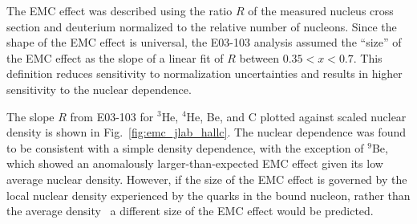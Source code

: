 The EMC effect was described using the ratio $R$ of the measured nucleus cross section and deuterium
normalized to the relative number of nucleons.
Since the shape of the EMC effect is universal, the E03-103 analysis assumed the ``size'' of the EMC
effect as the slope of a linear fit of $R$ between $0.35<x<0.7$.  This definition reduces sensitivity to
normalization uncertainties and results in higher sensitivity to the nuclear dependence.

The slope $R$ from E03-103 for $^3$He, $^4$He, Be, and C plotted against scaled nuclear
density is shown in Fig.~\ref{fig:emc_jlab_hallc}.  The nuclear dependence was found to be consistent
with a simple density dependence, with the exception of $^9$Be,  which showed an anomalously larger-than-expected 
EMC effect given its low average nuclear density.  However, if the size of the EMC effect is
governed by the local nuclear density experienced by the quarks in the bound nucleon, rather than the
average density~\cite{Seely:2009gt, PhysRevC.82.054614} a different size of the EMC effect would be predicted.

